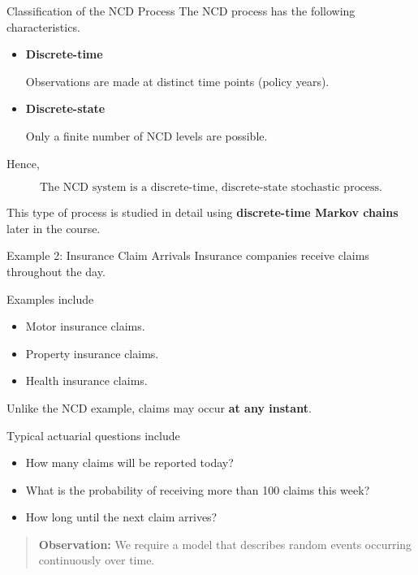 \documentclass[
  ignorenonframetext,
  aspectratio=169,
]{beamer}
\providecommand{\tightlist}{%
  \setlength{\itemsep}{0pt}\setlength{\parskip}{0pt}}
\begin{document}
\begin{frame}{Classification of the NCD Process}
\protect{}\label{classification-of-the-ncd-process}
The NCD process has the following characteristics.

\begin{itemize}
\item
  \textbf{Discrete-time}

  Observations are made at distinct time points (policy years).
\item
  \textbf{Discrete-state}

  Only a finite number of NCD levels are possible.
\end{itemize}

Hence,

\[
\boxed{\text{The NCD system is a discrete-time, discrete-state stochastic process.}}
\]

This type of process is studied in detail using \textbf{discrete-time
Markov chains} later in the course.
\end{frame}

\begin{frame}{Example 2: Insurance Claim Arrivals}
\protect{}\label{example-2-insurance-claim-arrivals}
Insurance companies receive claims throughout the day.

Examples include

\begin{itemize}
\tightlist
\item
  Motor insurance claims.
\item
  Property insurance claims.
\item
  Health insurance claims.
\end{itemize}

Unlike the NCD example, claims may occur \textbf{at any instant}.

Typical actuarial questions include

\begin{itemize}
\tightlist
\item
  How many claims will be reported today?
\item
  What is the probability of receiving more than 100 claims this week?
\item
  How long until the next claim arrives?
\end{itemize}

\begin{quote}
\textbf{Observation:} We require a model that describes random events
occurring continuously over time.
\end{quote}
\end{frame}
\end{document}
